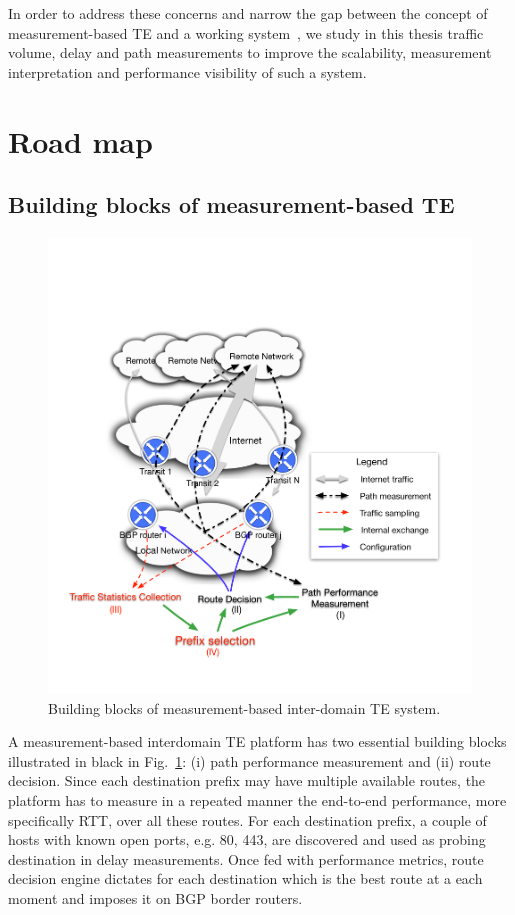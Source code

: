 In order to address these concerns and narrow the gap between the concept of measurement-based TE and a working system~\cite{b6}, we 
study in this thesis traffic volume, delay and path measurements to improve the scalability, measurement interpretation and performance visibility of such a system.


\section{Road map}
\subsection{Building blocks of measurement-based TE}

\begin{figure}[!htb]
\centering
\includegraphics[width=\textwidth]{gfx/chap1/archi.pdf}
\caption{Building blocks of measurement-based inter-domain TE system.}
\label{fig:archi}
\end{figure}

A measurement-based interdomain TE platform has two essential building blocks illustrated in black in Fig.~\ref{fig:archi}: (i) path performance measurement and (ii) route decision.
Since each destination prefix may have multiple available routes, the platform has to measure in a repeated manner the end-to-end performance, more specifically \ac{RTT}, over all these routes. 
For each destination prefix, a couple of hosts with known open ports, e.g. 80, 443, are discovered and used as probing destination in delay measurements.
Once fed with performance metrics, route decision engine dictates for each destination which is the best route at a each moment and imposes it on BGP border routers.

